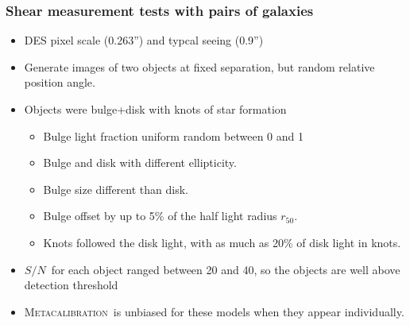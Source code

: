 \documentclass{beamer}
\newcommand{\Mcal}{\textsc{Metacalibration}}
\newcommand{\snr}{$S/N$}
\newcommand{\hlr}{$r_{50}$}
\begin{document}
\frame
{
    \frametitle{Shear measurement tests with pairs of galaxies}

 
    \begin{itemize}

        \item DES pixel scale (0.263'') and typcal seeing (0.9'')
        \item Generate images of two objects at fixed separation, but random
            relative position angle.

        \item Objects were bulge+disk with knots of star formation
            \begin{itemize}
                \item Bulge light fraction uniform random between 0 and 1
                \item Bulge and disk with different ellipticity.
                \item Bulge size different than disk.
                \item Bulge offset by up to 5\% of the half light radius \hlr.
                \item Knots followed the disk light, with as much as 20\%
                    of disk light in knots.
            \end{itemize}
        \item \snr\ for each object ranged between 20 and 40, so the objects
            are well above detection threshold

        \item \Mcal\ is unbiased for these models when they appear
            individually.

    \end{itemize}

}
\end{document}
